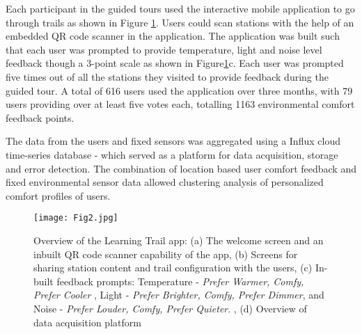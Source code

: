 Each participant in the guided tours used the interactive mobile application to go through trails as shown in Figure \ref{fig:mobileapp}. Users could scan stations with the help of an embedded QR code scanner in the application. The application was built such that each user was prompted to provide temperature, light and noise level feedback though a 3-point scale as shown in Figure\ref{fig:mobileapp}c. Each user was prompted five times out of all the stations they visited to provide feedback during the guided tour. A total of 616 users used the application over three months, with 79 users providing over at least five votes each, totalling 1163 environmental comfort feedback points.

The data from the users and fixed sensors was aggregated using a Influx cloud time-series database - which served as a platform for data acquisition, storage and error detection. The combination of location based user comfort feedback and fixed environmental sensor data allowed clustering analysis of personalized comfort profiles of users. 

\begin{figure}
\begin{center}
\texttt{[image: Fig2.jpg]}
\caption{Overview of the Learning Trail app: (a) The welcome screen and an inbuilt QR code scanner capability of the app, (b) Screens for sharing station content and trail configuration with the users, (c) In-built feedback prompts: Temperature - \emph{Prefer Warmer, Comfy, Prefer Cooler} , Light - \emph{Prefer Brighter, Comfy, Prefer Dimmer}, and Noise - \emph{Prefer Louder, Comfy, Prefer Quieter}.  , (d) Overview of data acquisition platform}
\label{fig:mobileapp}
\end{center}
\end{figure}

